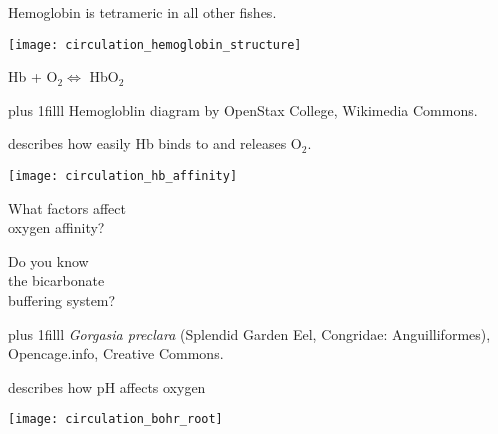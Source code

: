 \documentclass[t,handout]{beamer}  %
\begin{document}
\begin{frame}[c,plain]{Hemoglobin is tetrameric in all other fishes.}

\vspace{\baselineskip}

	\centering
	\texttt{[image: circulation\_hemoglobin\_structure]}
	
	Hb + O$_2 \Longleftrightarrow $ HbO$_2$
	
\vskip0pt plus 1filll
\hfill\tiny Hemogloblin diagram by OpenStax College, Wikimedia Commons.
\end{frame}

\begin{frame}[c,plain]{ describes how easily Hb binds to and releases O$_2$.}

\centering
\texttt{[image: circulation\_hb\_affinity]}

\pause

	
\end{frame}



{
\begin{frame}[t,plain]

	\vspace{2\baselineskip}
	
	\hangpara What factors affect\\  oxygen affinity?
	
	\vspace{4em}
	
	\hangpara Do you know\\ the bicarbonate\\ buffering system?
	
\vskip0pt plus 1filll
\hfill\tiny\textit{Gorgasia preclara} (Splendid Garden Eel, Congridae: Anguilliformes),\\
\hfill\tiny  Opencage.info, Creative Commons.
\end{frame}
}


\begin{frame}[c,plain]{ describes how pH affects oxygen }

	\centering
	\texttt{[image: circulation\_bohr\_root]}
	\pause
	

\end{frame}
\end{document}
